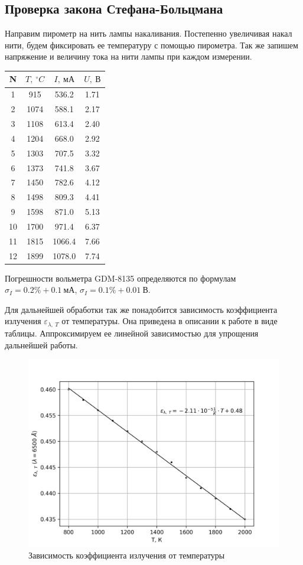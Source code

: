 \documentclass[14pt, a4paper]{report}
\begin{document}
\subsection{Проверка закона Стефана-Больцмана}

Направим пирометр на нить лампы накаливания. Постепенно увеличивая накал нити, будем фиксировать ее температуру с помощью пирометра. Так же запишем напряжение и величину тока на нити лампы при каждом измерении.

\begin{table}[H]
\centering
\begin{tabular}{|c|c|c|c|}
\hline
N & $T,\ ^\circ C$& $I,\ мА$ & $U,\ В$ \\ \hline
1 & 915 & 536.2 & 1.71 \\ \hline
2 & 1074 & 588.1 & 2.17 \\ \hline
3 & 1108 & 613.4 & 2.40 \\ \hline
4 & 1204 & 668.0 & 2.92 \\ \hline
5 & 1303 & 707.5 & 3.32 \\ \hline
6 & 1373 & 741.8 & 3.67 \\ \hline
7 & 1450 & 782.6 & 4.12 \\ \hline
8 & 1498 & 809.3 & 4.41 \\ \hline
9 & 1598 & 871.0 & 5.13 \\ \hline
10 & 1700 & 971.4 & 6.37 \\ \hline
11 & 1815 & 1066.4 & 7.66 \\ \hline
12 & 1899 & 1078.0 & 7.74 \\ \hline
\end{tabular}
\end{table}

Погрешности вольметра GDM-8135 определяются по формулам $\sigma_I=0.2\%+0.1\ мА$, $\sigma_I=0.1\%+0.01\ В$.

Для дальнейшей обработки так же понадобится зависимость коэффициента излучения $\varepsilon_{\lambda,\ T}$ от температуры. Она приведена в описании к работе в виде таблицы. Аппроксимируем ее линейной зависимостью для упрощения дальнейшей работы.

\begin{figure}[H]
\centering
\includegraphics[width=.8\linewidth]{../images/581-1}
\caption{Зависимость коэффициента излучения от температуры}
\end{figure}
\end{document}
